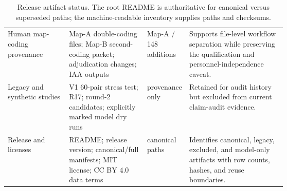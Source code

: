 \begin{table}[t]
\begin{tabularx}{\linewidth}{>{\raggedright\arraybackslash}p{0.22\linewidth}>{\raggedright\arraybackslash}p{0.29\linewidth}>{\raggedright\arraybackslash}p{0.12\linewidth}X}
Human map-coding provenance & Map-A double-coding files; Map-B second-coding packet; adjudication changes; IAA outputs & 274 Map-A / 148 additions & Supports file-level workflow separation while preserving the qualification and personnel-independence caveat. \\
Legacy and synthetic studies & V1 60-pair stress test; R17; round-2 candidates; explicitly marked model dry runs & provenance only & Retained for audit history but excluded from current claim-audit evidence. \\
Release and licenses & README; release version; canonical/full manifests; MIT license; CC BY 4.0 data terms & 158 canonical paths & Identifies canonical, legacy, excluded, and model-only artifacts with row counts, hashes, and reuse boundaries. \\
\bottomrule
\end{tabularx}
\caption{Release artifact status. The root README is authoritative for canonical versus superseded paths; the machine-readable inventory supplies paths and checksums.}
\label{tab:artifact-release-manifest}
\end{table}

